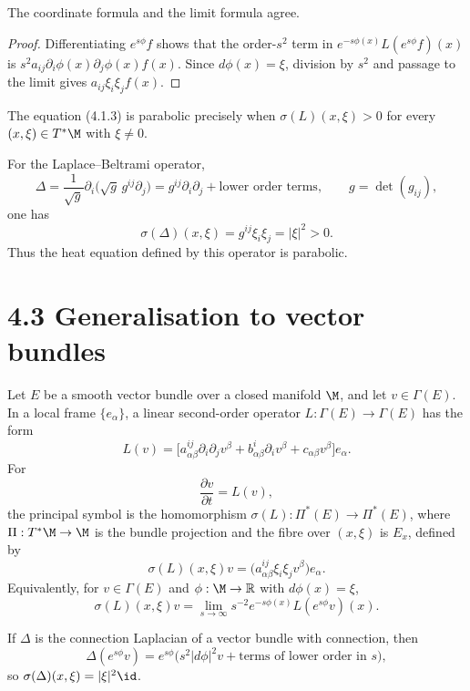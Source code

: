 \begin{remark}
\label{topping-pde-principal-symbol-limit-justification}
The coordinate formula and the limit formula agree.
\end{remark}
\begin{proof}
\sketch Differentiating $e^{s\phi}f$ shows that the order-$s^2$ term in
$e^{-s\phi(x)}L(e^{s\phi}f)(x)$ is
$s^2a_{ij}\partial_i\phi(x)\partial_j\phi(x)f(x)$. Since
$d\phi(x)=\xi$, division by $s^2$ and passage to the limit gives
$a_{ij}\xi_i\xi_jf(x)$.
\end{proof}

The equation (4.1.3) is parabolic precisely when
$\sigma(L)(x,\xi)>0$ for every $(x,\xi)\in T^*\M$ with $\xi\neq0$.

\begin{example}
\label{topping-pde-laplace-beltrami-example}
For the Laplace--Beltrami operator,
\[
\Delta=\frac{1}{\sqrt g}\partial_i\bigl(\sqrt g\,g^{ij}\partial_j\bigr)
 =g^{ij}\partial_i\partial_j+\text{lower order terms},
\qquad g=\det(g_{ij}),
\]
one has
\[
\sigma(\Delta)(x,\xi)=g^{ij}\xi_i\xi_j=\lvert\xi\rvert^2>0.
\]
Thus the heat equation defined by this operator is parabolic.
\end{example}

\section*{4.3 \quad Generalisation to vector bundles}

Let $E$ be a smooth vector bundle over a closed manifold $\M$, and let
$v\in\Gamma(E)$. In a local frame $\{e_\alpha\}$, a linear second-order operator
$L:\Gamma(E)\to\Gamma(E)$ has the form
\[
L(v)=\bigl[a^{ij}_{\alpha\beta}\partial_i\partial_jv^\beta
 +b^i_{\alpha\beta}\partial_iv^\beta+c_{\alpha\beta}v^\beta\bigr]e_\alpha.
\]
For
\[
\frac{\partial v}{\partial t}=L(v),
\tag{4.3.1}
\]
the principal symbol is the homomorphism
$\sigma(L):\Pi^*(E)\to\Pi^*(E)$, where $\Pi:T^*\M\to\M$ is the bundle
projection and the fibre over $(x,\xi)$ is $E_x$, defined by
\[
\sigma(L)(x,\xi)v
 =\bigl(a^{ij}_{\alpha\beta}\xi_i\xi_jv^\beta\bigr)e_\alpha.
\tag{4.3.2}
\]
Equivalently, for $v\in\Gamma(E)$ and $\phi:\M\to\mathbb R$ with
$d\phi(x)=\xi$,
\[
\sigma(L)(x,\xi)v
 =\lim_{s\to\infty}s^{-2}e^{-s\phi(x)}L(e^{s\phi}v)(x).
\tag{4.3.3}
\]

If $\Delta$ is the connection Laplacian of a vector bundle with connection,
then
\[
\Delta(e^{s\phi}v)
 =e^{s\phi}\bigl(s^2\lvert d\phi\rvert^2v+\text{terms of lower order in }s\bigr),
\]
so $\sigma(\Delta)(x,\xi)=\lvert\xi\rvert^2\id$.

